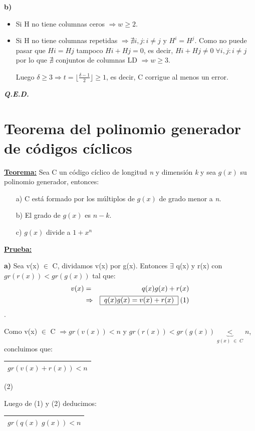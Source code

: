 \documentclass[12pt,a4paper]{report}
\newcounter{neq}
\newcommand{\QED}{\hfill \textit{\textbf{Q.E.D.}}}
\begin{document}
  			\vspace{5mm}
  			\textbf{b)}
  			\begin{itemize}
  				\item Si H no tiene columnas ceros $\Rightarrow w \geq 2$.
  				\item Si H no tiene columnas repetidas $\Rightarrow \nexists i,j : i \neq j$ y $H^{i} = H^{j}$. Como no puede pasar que $H{i} = H{j}$ tampoco $H{i} + H{j} = 0$, es decir, $H{i} + H{j} \neq 0 \; \forall i,j : i \neq j$ por lo que $\nexists$ conjuntos de columnas LD $\Rightarrow w \geq 3$.

  				\par Luego $\delta \geq 3 \Rightarrow t = \lfloor \frac{\delta-1}{2} \rfloor \geq 1$, es decir, C corrigue al menos un error.
  			\end{itemize}

  		\QED

  	\section{Teorema del polinomio generador de códigos cíclicos}
  		\textbf{\underline{Teorema:}} Sea C un código cíclico de longitud \textit{n} y  dimensión \textit{k} y sea $g(x)$ su polinomio generador, entonces:
  			\begin{itemize}
  				\item[a)] C está formado por los múltiplos de $g(x)$ de grado menor a \textit{n}.
  				\item[b)] El grado de $g(x)$ es $n - k$.
  				\item[c)] $g(x)$ divide a $1 + x^{n}$
  			\end{itemize}

  		\textbf{\underline{Prueba:}}
  			\par \textbf{a)} Sea v(x) $\in$ C, dividamos v(x) por g(x). Entonces $\exists$ q(x) y r(x) con $gr(r(x)) < gr(g(x))$ tal que:
  			\begin{eqnarray}
  				\nonumber v(x) &=& q(x) g(x) + r(x) \\
  				\nonumber & \Rightarrow & \begin{tabular}{|c|} \hline $q(x) g(x) = v(x) + r(x) $ \\ \hline \end{tabular} \; (1)
  			\end{eqnarray}.

  			\par Como v(x) $\in$ C $\Rightarrow gr(v(x)) < n$ y $gr(r(x)) < gr(g(x)) \underbrace{<}_{g(x) \; \in \; C} n $, concluimos que:
  			\begin{center}
  				\begin{tabular}{|c|} \hline $gr(v(x) + r(x)) < n $ \\ \hline \end{tabular} (2)
  			\end{center}
  			\par Luego de (1) y (2) deducimos: \begin{tabular}{|c|} \hline $gr(q(x) \; g(x)) < n $ \\ \hline \end{tabular}
\end{document}
